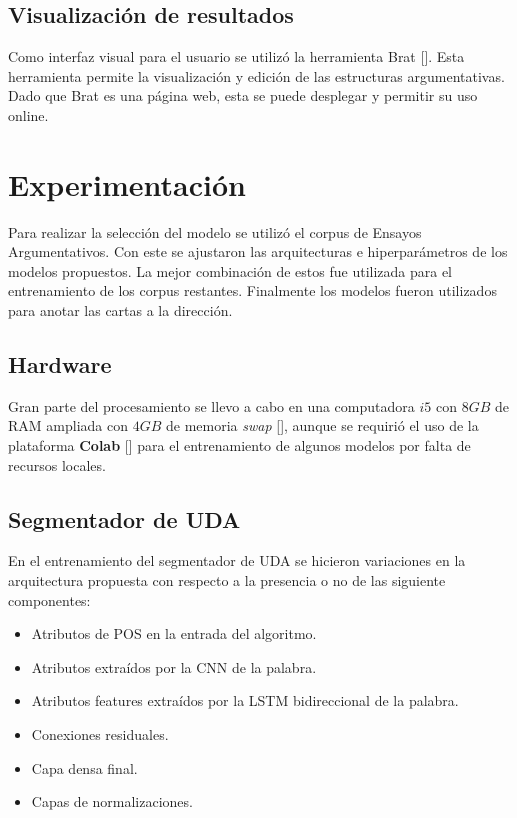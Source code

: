 \subsection{Visualización de resultados}

Como interfaz visual para el usuario se utilizó la herramienta Brat [\cite{brat}]. Esta herramienta permite
la visualización y edición de las estructuras argumentativas. Dado que Brat es una página web, esta se puede
desplegar y permitir su uso online.

\section{Experimentación}

Para realizar la selección del modelo se utilizó el corpus de Ensayos Argumentativos. Con este se ajustaron
las arquitecturas e hiperparámetros de los modelos propuestos. La mejor combinación de estos fue utilizada para el entrenamiento de
los corpus restantes. Finalmente los modelos fueron utilizados para anotar las cartas a la dirección. 

\subsection{Hardware}

Gran parte del procesamiento se llevo a cabo en una computadora $i5$ con $8GB$ de RAM ampliada con $4GB$ de memoria 
\emph{swap} [\cite{swap}], aunque se requirió el uso de la plataforma \textbf{Colab} [\cite{colab}] para 
el entrenamiento de algunos modelos por falta de recursos locales.

\subsection{Segmentador de UDA}

En el entrenamiento del segmentador de UDA se hicieron variaciones en la arquitectura propuesta con respecto a la
presencia o no de las siguiente componentes:

\begin{itemize}
    \item Atributos de POS en la entrada del algoritmo.
    \item Atributos extraídos por la CNN de la palabra.
    \item Atributos features extraídos por la LSTM bidireccional de la palabra.
    \item Conexiones residuales.
    \item Capa densa final.
    \item Capas de normalizaciones.
\end{itemize}

